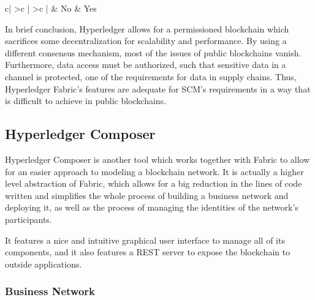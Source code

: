 \begin{table}[]
\begin{tabular}{c|
>{}c |
>{}c |}
              & {\color[HTML]{000000} No}                                                                                                                                                  & {\color[HTML]{000000} Yes}                                                                                                                                                                    \\ \hline
\end{tabular}
\caption{Comparison between traditional PoW consensus and Hyperledger's BFT consensus mechanism}
\label{table:consensus_comparison}
\end{table}





In brief conclusion, Hyperledger allows for a permissioned blockchain which sacrifices some decentralization for scalability and performance. By using a different consensus mechanism, most of the issues of public blockchains vanish. Furthermore, data access must be authorized, such that sensitive data in a channel is protected, one of the requirements for data in supply chains. Thus, Hyperledger Fabric's features are adequate for SCM's requirements in a way that is difficult to achieve in public blockchains.

\subsection{Hyperledger Composer}
\label{sec:composer-background}
Hyperledger Composer is another tool which works together with Fabric to allow for an easier approach to modeling a blockchain network. It is actually a higher level abstraction of Fabric, which allows for a big reduction in the lines of code written and simplifies the whole process of building a business network and deploying it, as well as the process of managing the identities of the network's participants. 

It features a nice and intuitive graphical user interface to manage all of its components, and it also features a REST server to expose the blockchain to outside applications.

\subsubsection{Business Network}

